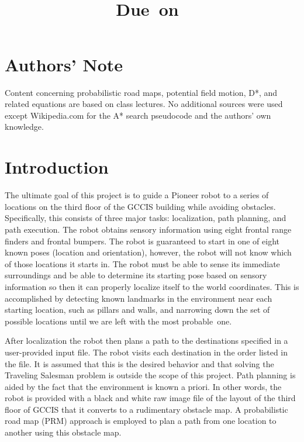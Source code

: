 \documentclass[11pt]{article}
\title{
  \vspace{2in}
  \textmd{\textbf{\hmwkTitle}} \\
  \vspace{0.1in}
  \large{\textmd{\hmwkClassInstructor}} \\
  \vspace{0.1in}
  \normalsize\small{Due\ on\ \hmwkDueDate} \\
  \vspace{3in}
}
\date{} %
\author{\textbf{\hmwkAuthorName}}
\begin{document}
\maketitle
\thispagestyle{empty}

\newpage %


\setcounter{secnumdepth}{0}
\footnotesize
\section{Authors' Note}

Content concerning probabilistic road maps, potential field motion, D*, and related equations are based on class lectures. No additional sources were used except Wikipedia.com for the A* search pseudocode and the authors' own knowledge.

\setcounter{secnumdepth}{3}
\normalsize
\section{Introduction}

The ultimate goal of this project is to guide a Pioneer robot to a series of locations on the third floor of the GCCIS building while avoiding obstacles. Specifically, this consists of three major tasks: localization, path planning, and path execution. The robot obtains sensory information using eight frontal range finders and frontal bumpers. The robot is guaranteed to start in one of eight known poses (location and orientation), however, the robot will not know which of those locations it starts in. The robot must be able to sense its immediate surroundings and be able to determine its starting pose based on sensory information so then it can properly localize itself to the world coordinates. This is accomplished by detecting known landmarks in the environment near each starting location, such as pillars and walls, and narrowing down the set of possible locations until we are left with the most probable~one. 

After localization the robot then plans a path to the destinations specified in a user-provided input file. The robot visits each destination in the order listed in the file. It is assumed that this is the desired behavior and that solving the Traveling Salesman problem is outside the scope of this project. Path planning is aided by the fact that the environment is known a priori. In other words, the robot is provided with a black and white raw image file of the layout of the third floor of GCCIS that it converts to a rudimentary obstacle map. A probabilistic road map (PRM) approach is employed to plan a path from one location to another using this obstacle map.
\end{document}
